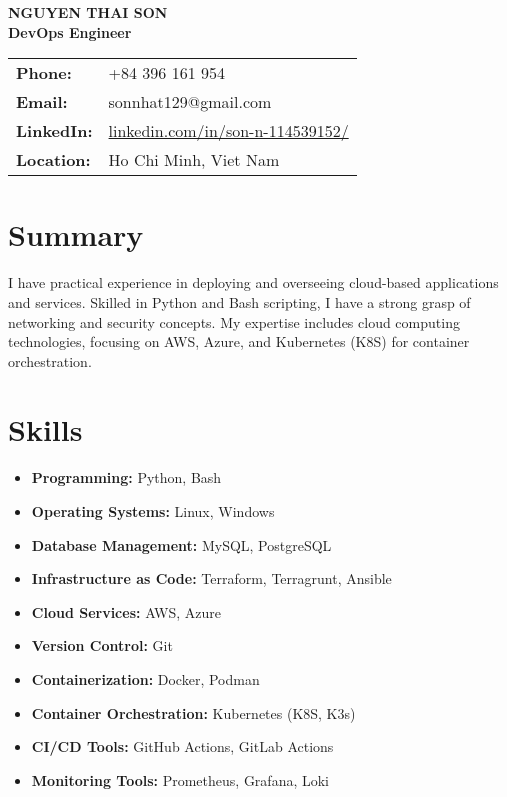 \documentclass[a4paper,10pt]{article}
\begin{document}
\begin{center}
    {\Huge \textbf{NGUYEN THAI SON}} \\
    \vspace{6pt}
    \textbf{DevOps Engineer} \\
    \vspace{6pt}
    \begin{tabular}{ll}
        \textbf{Phone:} & +84 396 161 954 \\
        \textbf{Email:} & sonnhat129@gmail.com \\
        \textbf{LinkedIn:} & \href{https://www.linkedin.com/in/son-n-114539152/}{linkedin.com/in/son-n-114539152/} \\
        \textbf{Location:} & Ho Chi Minh, Viet Nam \\
    \end{tabular}
\end{center}

\vspace{10pt}
\section*{Summary}
I have practical experience in deploying and overseeing cloud-based applications and services. Skilled in Python and Bash scripting, I have a strong grasp of networking and security concepts. My expertise includes cloud computing technologies, focusing on AWS, Azure, and Kubernetes (K8S) for container orchestration.

\vspace{5pt}
\section*{Skills}
\begin{itemize}[leftmargin=0.5in]
    \item \textbf{Programming:} Python, Bash
    \item \textbf{Operating Systems:} Linux, Windows
    \item \textbf{Database Management:} MySQL, PostgreSQL
    \item \textbf{Infrastructure as Code:} Terraform, Terragrunt, Ansible
    \item \textbf{Cloud Services:} AWS, Azure
    \item \textbf{Version Control:} Git
    \item \textbf{Containerization:} Docker, Podman
    \item \textbf{Container Orchestration:} Kubernetes (K8S, K3s)
    \item \textbf{CI/CD Tools:} GitHub Actions, GitLab Actions
    \item \textbf{Monitoring Tools:} Prometheus, Grafana, Loki
\end{itemize}
\end{document}
